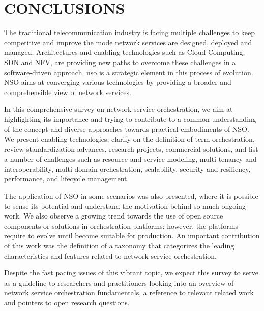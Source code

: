 \section{CONCLUSIONS}
\label{sec:Conclusion}

The traditional telecommunication industry is facing multiple challenges to keep competitive and improve the mode network services are designed, deployed and managed. Architectures and enabling technologies such as Cloud Computing, SDN and NFV, are providing new paths to  overcome these challenges in a software-driven approach.  \acrfull{nso} is a strategic element in this process of evolution. NSO aims at  converging various technologies by providing a broader and comprehensible view of network services. 

In this comprehensive survey on network service orchestration, we aim at highlighting its importance and trying to contribute to a common understanding of the concept and diverse approaches towards practical embodiments of NSO. We present enabling technologies, clarify on the definition of term orchestration, review standardization advances, research projects, commercial solutions, and list a number of challenges such as resource and service modeling, multi-tenancy and interoperability, multi-domain orchestration, scalability, security and resiliency, performance, and lifecycle management. 

The application of NSO in some scenarios was also presented, where it is possible to sense its potential and understand the motivation behind so much ongoing work. We also observe a growing trend towards the use of open source components or solutions in orchestration platforms; however, the platforms require to evolve until become suitable for production. An important contribution of this work was the definition of a taxonomy that categorizes the leading characteristics and features related to network service orchestration.

Despite the fast pacing issues of this vibrant topic, we expect this survey to serve as a guideline to researchers and practitioners looking into an overview of network service orchestration fundamentals, a reference to relevant related work and pointers to open research questions.
